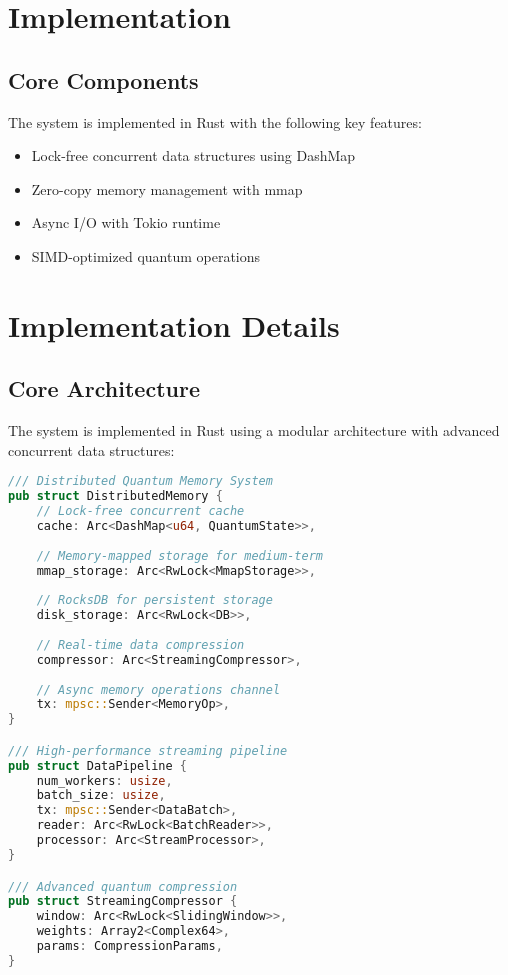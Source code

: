 \documentclass[10pt,twocolumn]{article}
\begin{document}
\section{Implementation}
\subsection{Core Components}
The system is implemented in Rust with the following key features:
\begin{itemize}
    \item Lock-free concurrent data structures using DashMap
    \item Zero-copy memory management with mmap
    \item Async I/O with Tokio runtime
    \item SIMD-optimized quantum operations
\end{itemize}

\section{Implementation Details}
\subsection{Core Architecture}
The system is implemented in Rust using a modular architecture with advanced concurrent data structures:

\begin{lstlisting}[language=Rust]
/// Distributed Quantum Memory System
pub struct DistributedMemory {
    // Lock-free concurrent cache
    cache: Arc<DashMap<u64, QuantumState>>,
    
    // Memory-mapped storage for medium-term
    mmap_storage: Arc<RwLock<MmapStorage>>,
    
    // RocksDB for persistent storage
    disk_storage: Arc<RwLock<DB>>,
    
    // Real-time data compression
    compressor: Arc<StreamingCompressor>,
    
    // Async memory operations channel
    tx: mpsc::Sender<MemoryOp>,
}

/// High-performance streaming pipeline
pub struct DataPipeline {
    num_workers: usize,
    batch_size: usize,
    tx: mpsc::Sender<DataBatch>,
    reader: Arc<RwLock<BatchReader>>,
    processor: Arc<StreamProcessor>,
}

/// Advanced quantum compression
pub struct StreamingCompressor {
    window: Arc<RwLock<SlidingWindow>>,
    weights: Array2<Complex64>,
    params: CompressionParams,
}
\end{lstlisting}
\end{document}
